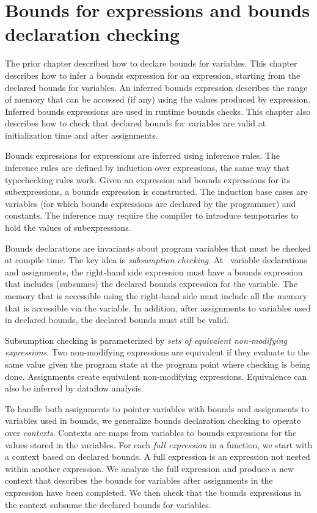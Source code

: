 
\chapter{Bounds for expressions and bounds declaration checking}
\label{chapter:checking-bounds}

The prior chapter described how to declare bounds for variables.
This chapter describes how to infer a bounds expression for 
an expression, starting from the declared bounds for variables.
An inferred bounds expression
describes the range of memory that can be accessed (if any) using 
the values produced by expression.  Inferred bounds expressions
are used in runtime bounds checks.   This chapter also describes how to
 check that declared bounds for variables are valid at initialization
 time and after assignments.

Bounds expressions for expressions are inferred using inference
rules.  The inference rules are defined by induction over expressions, 
the same way that typechecking rules work.  Given an expression
and bounds expressions for its subexpressions, a bounds expression
is constructed.  The induction base cases are variables (for which
bounds expressions are declared by the programmer) and constants.
The inference may require the compiler to introduce temporaries to
hold the values of subexpressions.

Bounds declarations are invariants about program variables
that must be checked at compile time.  The key idea is {\em subsumption checking}.
At \arrayptr\ variable declarations and assignments, 
the right-hand side expression must have a bounds expression that includes (subsumes) 
the declared bounds  expression for the variable.  The memory that is accessible using
the right-hand side must include all the memory that is accessible via the variable.
In addition, after assignments to variables used in declared bounds, the
declared bounds must still be valid.

Subsumption checking is parameterized by {\it sets of equivalent non-modifying expressions}.
Two non-modifying expressions are equivalent if they
evaluate to the same value given the program state at the program point where 
checking is being done.  Assignments create equivalent non-modifying
expressions. Equivalence can also be inferred by dataflow analysis.

To handle both assignments to pointer variables with bounds and assignments
to variables used in bounds, we generalize bounds declaration
checking to operate over {\em contexts}.  Contexts are maps from variables
to bounds expressions for the values stored in the variables.
For each {\em full expression} in a function, we start with a context based
on declared bounds.
A full expression \cite[Annex C]{ISO2011} is an expression not nested within another expression.
We analyze the full expression and produce a new
context that describes the bounds for variables after assignments
in the expression have been completed.  We then check that the bounds
expressions in the context subsume the declared bounds for variables.

